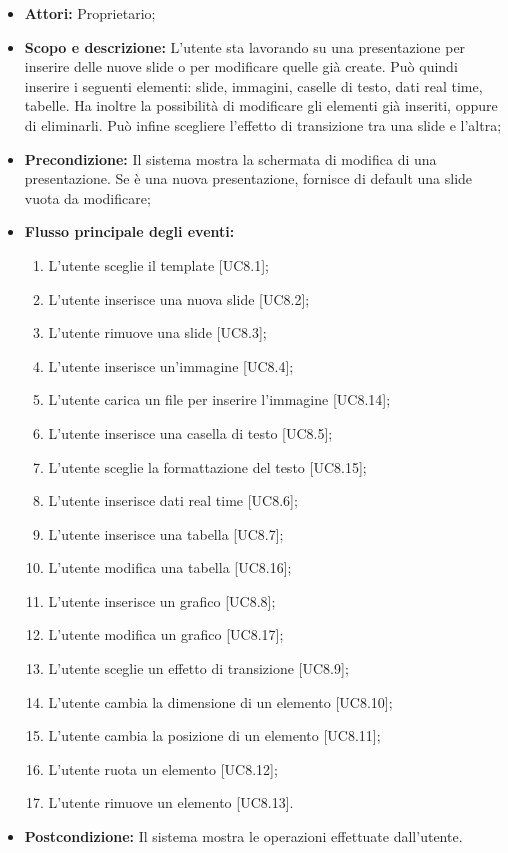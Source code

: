 \begin{itemize}
	\item \textbf{Attori:} Proprietario;
	\item \textbf{Scopo e descrizione:} L'utente sta lavorando su una presentazione per inserire delle nuove slide o per modificare quelle già create. Può quindi inserire i seguenti elementi: slide, immagini, caselle di testo, dati real time, tabelle. Ha inoltre la possibilità di modificare gli elementi già inseriti, oppure di eliminarli. Può infine scegliere l'effetto di transizione tra una slide e l'altra;
	\item \textbf{Precondizione:} Il sistema mostra la schermata di modifica di una presentazione. Se è una nuova presentazione, fornisce di default una slide vuota da modificare;
	\item \textbf{Flusso principale degli eventi:}
	\begin{enumerate}
		
		\item L'utente sceglie il template [UC8.1];
		
		\item L'utente inserisce una nuova slide [UC8.2];
		\item L'utente rimuove una slide [UC8.3];
		
		\item L'utente inserisce un'immagine [UC8.4];
		\item L'utente carica un file per inserire l'immagine [UC8.14];
		
		\item L'utente inserisce una casella di testo [UC8.5];
		\item L'utente sceglie la formattazione del testo [UC8.15];
		
		\item L'utente inserisce dati real time [UC8.6];
		
		\item L'utente inserisce una tabella [UC8.7];
		\item L'utente modifica una tabella [UC8.16];
		
		\item L'utente inserisce un grafico [UC8.8];
		\item L'utente modifica un grafico [UC8.17];
		
		\item L'utente sceglie un effetto di transizione [UC8.9];
		
		\item L'utente cambia la dimensione di un elemento [UC8.10];
		
		\item L'utente cambia la posizione di un elemento [UC8.11];
		
		\item L'utente ruota un elemento [UC8.12];
		
		\item L'utente rimuove un elemento [UC8.13].
	\end{enumerate}
	\item \textbf{Postcondizione:} Il sistema mostra le operazioni effettuate dall'utente.
\end{itemize}


